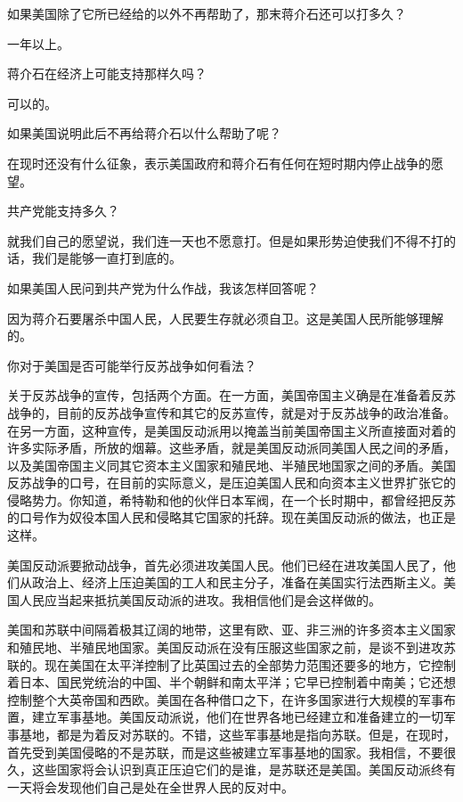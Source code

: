 如果美国除了它所已经给的以外不再帮助了，那末蒋介石还可以打多久？

一年以上。

蒋介石在经济上可能支持那样久吗？

可以的。

如果美国说明此后不再给蒋介石以什么帮助了呢？

在现时还没有什么征象，表示美国政府和蒋介石有任何在短时期内停止战争的愿望。

共产党能支持多久？

就我们自己的愿望说，我们连一天也不愿意打。但是如果形势迫使我们不得不打的话，我们是能够一直打到底的。

如果美国人民问到共产党为什么作战，我该怎样回答呢？

因为蒋介石要屠杀中国人民，人民要生存就必须自卫。这是美国人民所能够理解的。

你对于美国是否可能举行反苏战争如何看法？

关于反苏战争的宣传，包括两个方面。在一方面，美国帝国主义确是在准备着反苏战争的，目前的反苏战争宣传和其它的反苏宣传，就是对于反苏战争的政治准备。在另一方面，这种宣传，是美国反动派用以掩盖当前美国帝国主义所直接面对着的许多实际矛盾，所放的烟幕。这些矛盾，就是美国反动派同美国人民之间的矛盾，以及美国帝国主义同其它资本主义国家和殖民地、半殖民地国家之间的矛盾。美国反苏战争的口号，在目前的实际意义，是压迫美国人民和向资本主义世界扩张它的侵略势力。你知道，希特勒和他的伙伴日本军阀，在一个长时期中，都曾经把反苏的口号作为奴役本国人民和侵略其它国家的托辞。现在美国反动派的做法，也正是这样。

美国反动派要掀动战争，首先必须进攻美国人民。他们已经在进攻美国人民了，他们从政治上、经济上压迫美国的工人和民主分子，准备在美国实行法西斯主义。美国人民应当起来抵抗美国反动派的进攻。我相信他们是会这样做的。

美国和苏联中间隔着极其辽阔的地带，这里有欧、亚、非三洲的许多资本主义国家和殖民地、半殖民地国家。美国反动派在没有压服这些国家之前，是谈不到进攻苏联的。现在美国在太平洋控制了比英国过去的全部势力范围还要多的地方，它控制着日本、国民党统治的中国、半个朝鲜和南太平洋；它早已控制着中南美；它还想控制整个大英帝国和西欧。美国在各种借口之下，在许多国家进行大规模的军事布置，建立军事基地。美国反动派说，他们在世界各地已经建立和准备建立的一切军事基地，都是为着反对苏联的。不错，这些军事基地是指向苏联。但是，在现时，首先受到美国侵略的不是苏联，而是这些被建立军事基地的国家。我相信，不要很久，这些国家将会认识到真正压迫它们的是谁，是苏联还是美国。美国反动派终有一天将会发现他们自己是处在全世界人民的反对中。

